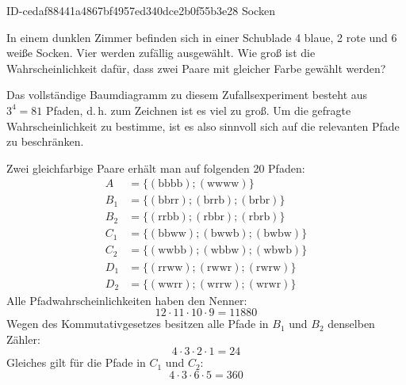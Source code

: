 \begin{exercise}
      {ID-cedaf88441a4867bf4957ed340dce2b0f55b3e28}
      {Socken}
  \ifproblem\problem\par
    In einem dunklen Zimmer befinden sich in einer Schublade 4 blaue, 2 rote
    und 6 weiße Socken. Vier werden zufällig ausgewählt. Wie groß ist die
    Wahrscheinlichkeit dafür, dass zwei Paare mit gleicher Farbe gewählt werden?
  \fi
  \ifoutcome\outcome\par
    Das vollständige Baumdiagramm zu diesem
    Zufallsexperiment besteht aus $3^4=81$
    Pfaden, d.\,h. zum Zeichnen ist es viel
    zu groß. Um die gefragte Wahrscheinlichkeit
    zu bestimme, ist es also sinnvoll sich
    auf die relevanten Pfade zu beschränken.
    \par
    Zwei gleichfarbige Paare erhält man auf
    folgenden 20 Pfaden:
    \begin{equation*}
      \begin{split}
        A&=\{(\text{bbbb});(\text{wwww})\}
        \\
        B_1&=\{(\text{bbrr});(\text{brrb});(\text{brbr})\}
        \\
        B_2&=\{(\text{rrbb});(\text{rbbr});(\text{rbrb})\}
        \\
        C_1&=\{(\text{bbww});(\text{bwwb});(\text{bwbw})\}
        \\
        C_2&=\{(\text{wwbb});(\text{wbbw});(\text{wbwb})\}
        \\
        D_1&=\{(\text{rrww});(\text{rwwr});(\text{rwrw})\}
        \\
        D_2&=\{(\text{wwrr});(\text{wrrw});(\text{wrwr})\}
      \end{split}
    \end{equation*}
    Alle Pfadwahrscheinlichkeiten haben den Nenner:
    \begin{equation*}
      12\cdot11\cdot10\cdot9=\num{11880}
    \end{equation*}
    Wegen des Kommutativgesetzes besitzen alle
    Pfade in $B_1$ und $B_2$ denselben Zähler:
    \begin{equation*}
      4\cdot3\cdot2\cdot1=\num{24}
    \end{equation*}
    Gleiches gilt für die Pfade in $C_1$ und $C_2$:
    \begin{equation*}
      4\cdot3\cdot6\cdot5=\num{360}

\end{equation*}
\end{exercise}

